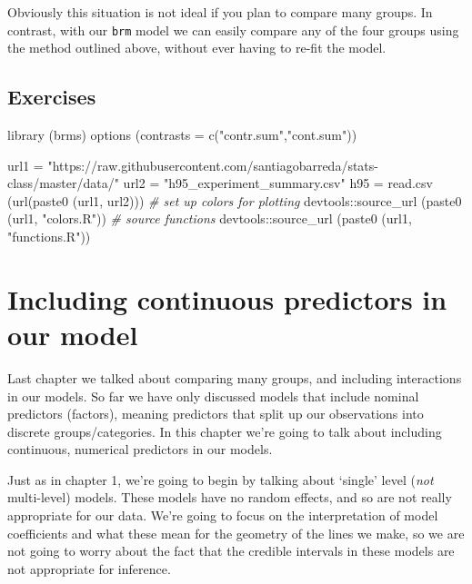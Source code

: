 \documentclass[
]{book}
\newenvironment{Shaded}{\begin{snugshade}}{\end{snugshade}}
\newcommand{\AttributeTok}[1]{\textcolor[rgb]{0.77,0.63,0.00}{#1}}
\newcommand{\CommentTok}[1]{\textcolor[rgb]{0.56,0.35,0.01}{\textit{#1}}}
\newcommand{\FunctionTok}[1]{\textcolor[rgb]{0.00,0.00,0.00}{#1}}
\newcommand{\NormalTok}[1]{#1}
\newcommand{\OtherTok}[1]{\textcolor[rgb]{0.56,0.35,0.01}{#1}}
\newcommand{\SpecialCharTok}[1]{\textcolor[rgb]{0.00,0.00,0.00}{#1}}
\newcommand{\StringTok}[1]{\textcolor[rgb]{0.31,0.60,0.02}{#1}}
\begin{document}
Obviously this situation is not ideal if you plan to compare many groups. In contrast, with our \texttt{brm} model we can easily compare any of the four groups using the method outlined above, without ever having to re-fit the model.

\hypertarget{exercises-3}{%
\section{Exercises}\label{exercises-3}}

\begin{Shaded}
\begin{Highlighting}[]
\FunctionTok{library}\NormalTok{ (brms)}
\FunctionTok{options}\NormalTok{ (}\AttributeTok{contrasts =} \FunctionTok{c}\NormalTok{(}\StringTok{"contr.sum"}\NormalTok{,}\StringTok{"cont.sum"}\NormalTok{))}

\NormalTok{url1 }\OtherTok{=} \StringTok{"https://raw.githubusercontent.com/santiagobarreda/stats{-}class/master/data/"}
\NormalTok{url2 }\OtherTok{=} \StringTok{"h95\_experiment\_summary.csv"}
\NormalTok{h95 }\OtherTok{=} \FunctionTok{read.csv}\NormalTok{ (}\FunctionTok{url}\NormalTok{(}\FunctionTok{paste0}\NormalTok{ (url1, url2)))}
\CommentTok{\# set up colors for plotting}
\NormalTok{devtools}\SpecialCharTok{::}\FunctionTok{source\_url}\NormalTok{ (}\FunctionTok{paste0}\NormalTok{ (url1, }\StringTok{"colors.R"}\NormalTok{))}
\CommentTok{\# source functions}
\NormalTok{devtools}\SpecialCharTok{::}\FunctionTok{source\_url}\NormalTok{ (}\FunctionTok{paste0}\NormalTok{ (url1, }\StringTok{"functions.R"}\NormalTok{))}
\end{Highlighting}
\end{Shaded}

\hypertarget{including-continuous-predictors-in-our-model}{%
\chapter{Including continuous predictors in our model}\label{including-continuous-predictors-in-our-model}}

Last chapter we talked about comparing many groups, and including interactions in our models. So far we have only discussed models that include nominal predictors (factors), meaning predictors that split up our observations into discrete groups/categories. In this chapter we're going to talk about including continuous, numerical predictors in our models.

Just as in chapter 1, we're going to begin by talking about `single' level (\emph{not} multi-level) models. These models have no random effects, and so are not really appropriate for our data. We're going to focus on the interpretation of model coefficients and what these mean for the geometry of the lines we make, so we are not going to worry about the fact that the credible intervals in these models are not appropriate for inference.
\end{document}
